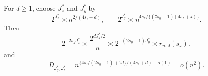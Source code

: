 For \(d\ge1\), choose \(J_z^*\) and \(J_y^*\) by
\[
2^{J_z^*}\asymp n^{2/(4s_z+d)},
\qquad
2^{J_y^*}\asymp n^{4s_z/\{(2s_y+1)(4s_z+d)\}}.
\]
Then
\[
2^{-2s_zJ_z^*}\asymp\frac{2^{dJ_z^*/2}}n
\asymp2^{-(2s_y+1)J_y^*}
\asymp r_{n,d}(s_z),
\]
and
\[
D_{J_y^*,J_z^*}
=n^{\{4s_z/(2s_y+1)+2d\}/(4s_z+d)+o(1)}=o(n^2).
\]